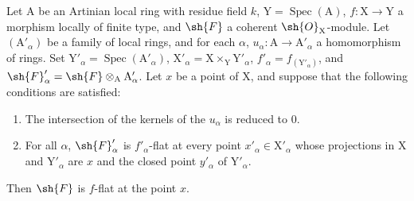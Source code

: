 \begin{proposition}[11.4.12]
\label{IV.11.4.12}
Let $\mathrm{A}$ be an Artinian local ring with residue field $k$,
$\mathrm{Y}=\operatorname{Spec}(\mathrm{A})$, $f:\mathrm{X}\to\mathrm{Y}$ a morphism locally of finite type, and $\sh{F}$ a coherent $\sh{O}_\mathrm{X}$-module.
Let $(\mathrm{A}'_\alpha)$ be a family of local rings, and for each $\alpha$, $u_\alpha:\mathrm{A}\to\mathrm{A}'_\alpha$ a homomorphism
of rings. Set $\mathrm{Y}'_\alpha=\operatorname{Spec}(\mathrm{A}'_\alpha)$, $\mathrm{X}'_\alpha=\mathrm{X}\times_\mathrm{Y}\mathrm{Y}'_\alpha$,
$f'_\alpha=f_{(\mathrm{Y}'_\alpha)}$, and $\sh{F}'_\alpha=\sh{F}\otimes_\mathrm{A}\mathrm{A}'_\alpha$. Let $x$ be a point
of $\mathrm{X}$, and suppose that the following conditions are satisfied:
\begin{enumerate}[label=(\roman*)]
  \item The intersection of the kernels of the $u_\alpha$ is reduced to $0$.
  \item For all $\alpha$, $\sh{F}'_\alpha$ is $f'_\alpha$-flat at every point $x'_\alpha\in\mathrm{X}'_\alpha$ whose projections in $\mathrm{X}$ and $\mathrm{Y}'_\alpha$
  are $x$ and the closed point $y'_\alpha$ of $\mathrm{Y}'_\alpha$.
\end{enumerate}

Then $\sh{F}$ is $f$-flat at the point $x$.
\end{proposition}

